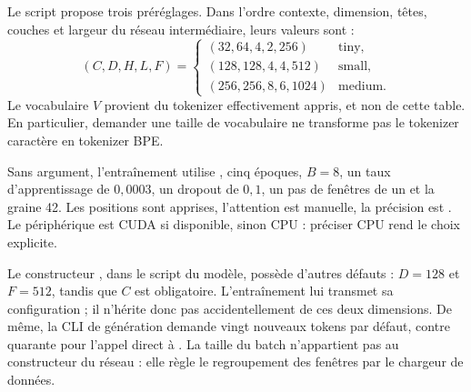 
Le script propose trois préréglages. Dans l'ordre contexte, dimension, têtes, couches et largeur du réseau intermédiaire, leurs valeurs sont :
\[
 (C,D,H,L,F)=
 \begin{cases}
 (32,64,4,2,256)&\text{tiny},\\
 (128,128,4,4,512)&\text{small},\\
 (256,256,8,6,1024)&\text{medium}.
 \end{cases}
\]
Le vocabulaire $V$ provient du tokenizer effectivement appris, et non de cette
table. En particulier, demander une taille de vocabulaire ne transforme pas le
tokenizer caractère en tokenizer BPE.


Sans argument, l'entraînement utilise , cinq époques, $B=8$, un
taux d'apprentissage de $0{,}0003$, un dropout de $0{,}1$, un pas de fenêtres
de un et la graine 42. Les positions sont apprises, l'attention est manuelle,
la précision est . Le périphérique est CUDA si disponible,
sinon CPU : préciser CPU rend le choix explicite.

Le constructeur , dans le script du modèle, possède d'autres
défauts : $D=128$ et $F=512$, tandis que $C$ est obligatoire. L'entraînement
lui transmet sa configuration ; il n'hérite donc pas accidentellement de ces
deux dimensions. De même, la CLI de génération demande vingt nouveaux tokens
par défaut, contre quarante pour l'appel direct à .
La taille du batch n'appartient pas au constructeur du réseau : elle règle
le regroupement des fenêtres par le chargeur de données.


